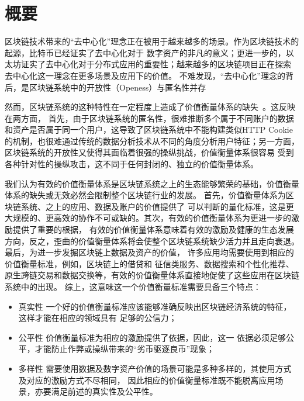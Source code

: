 
\section{概要}

区块链技术带来的“去中心化”理念正在被用于越来越多的场景。作为区块链技术的起源，比特币已经证实了去中心化对于
数字资产的非凡的意义；更进一步的，以太坊证实了去中心化对于分布式应用的重要性；越来越多的区块链项目正在探索
去中心化这一理念在更多场景及应用下的价值。
不难发现，“去中心化”理念的背后，是区块链系统中的开放性（Openess）与匿名性并存

然而，区块链系统的这种特性在一定程度上造成了价值衡量体系的缺失~\cite{meiklejohn2013fistful}。这反映在两方面，
首先，由于区块链系统的匿名性，很难推断多个属于不同账户的数据和资产是否属于同一个用户，这导致了区块链系统中不能构建类似HTTP Cookie~\cite{Cookie}
的机制，也很难通过传统的数据分析技术从不同的角度分析用户特征；另一方面，区块链系统的开放性又使得其面临着很强的操纵挑战，价值衡量体系很容易
受到各种针对性的操纵攻击，这不同于任何封闭的、独立的价值衡量体系。

我们认为有效的价值衡量体系是区块链系统之上的生态能够繁荣的基础，价值衡量体系的缺失或无效必然会限制整个区块链行业的发展。
首先，价值衡量体系为区块链系统、之上的应用、数据及账户的价值提供了
可以判断的量化标准，这是更大规模的、更高效的协作不可或缺的。其次，有效的价值衡量体系为更进一步的激励提供了重要的根据，
有效的价值衡量体系意味着有效的激励及健康的生态发展方向，反之，歪曲的价值衡量体系将会使整个区块链系统缺少活力并且走向衰退。
最后，为进一步发掘区块链上数据及资产的价值，
许多应用均需要使用到相应的价值衡量标准，例如，区块链上的借贷和
征信类服务、数据搜索和个性化推荐、原生跨链交易和数据交换等，有效的价值衡量体系直接地促使了这些应用在区块链系统中的出现。
综上，这意味这一个价值衡量标准需要具备三个特点：
\begin{itemize}
\item{真实性} 一个好的价值衡量标准应该能够准确反映出区块链经济系统的特征，这样才能在相应的领域具有
足够的公信力；
\item{公平性} 价值衡量标准为相应的激励提供了依据，因此，这一
依据必须足够公平，才能防止作弊或操纵带来的“劣币驱逐良币”现象；
\item{多样性} 需要使用数据及数字资产价值的场景可能是多种多样的，其使用方式及对应的激励方式不尽相同，
因此相应的价值衡量标准既不能脱离应用场景，亦要满足前述的真实性及公平性。
\end{itemize}


